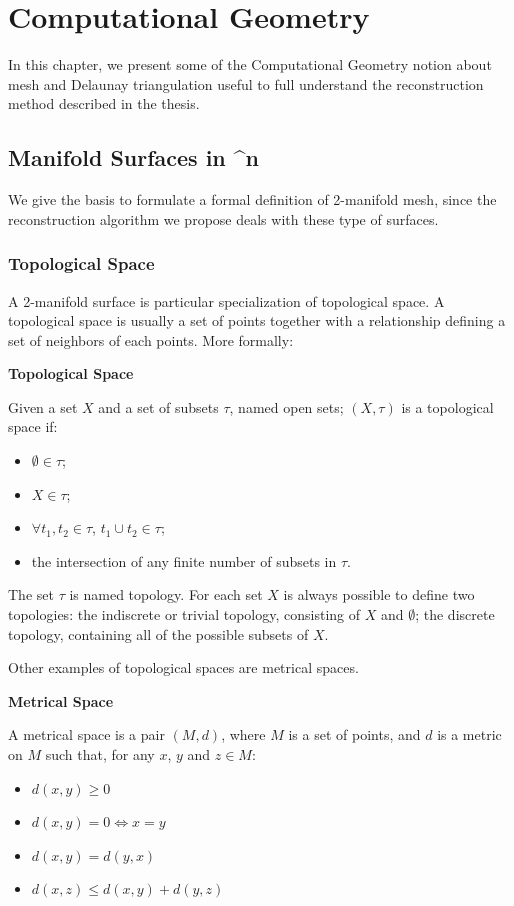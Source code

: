 \chapter{Computational Geometry}
In this chapter, we present some of the Computational Geometry notion about mesh and Delaunay triangulation useful to full understand the reconstruction method described in the thesis. 
\section{Manifold Surfaces in ^n}
We give the basis to formulate a formal definition of 2-manifold mesh, since the reconstruction algorithm we propose deals with these type of surfaces. 
\subsection{Topological Space}
A 2-manifold surface is particular specialization of topological space. 
A topological space is usually a set of points together with a  relationship defining a set of neighbors of each points. More formally:
\begin{mydef}
\textbf{Topological Space}

  Given a set $X$ and a set of subsets $\tau$, named open sets; $(X, \tau)$ is a topological space if:
  \begin{itemize}
    \item $\emptyset \in \tau$;
    \item $X \in \tau$;
    \item $\forall t_1,t_2 \in \tau $, $t_1 \cup t_2 \in \tau$;
    \item the intersection of any finite number of subsets in $\tau$.
  \end{itemize}
\end{mydef}
The set $\tau$ is named topology.
For each set $X$ is always possible to define two topologies: the indiscrete or trivial topology, consisting of $X$ and $\emptyset$; the discrete topology, containing all of the possible subsets of $X$.

Other examples of topological spaces are metrical spaces. 
\begin{mydef}
  \textbf{Metrical Space}
  
A metrical space is a pair $(M, d)$, where $M$ is a set of points, and $d$ is a metric on $M$ such that, for any $x$, $y$ and $z \in M$:
\begin{itemize}
  \item $d(x, y) \geq 0$
  \item $d(x, y) = 0 \Longleftrightarrow x = y$
  \item $d(x, y) = d(y, x)$
  \item $d(x, z) \leq d(x, y) + d(y, z)$
\end{itemize}

\end{mydef}


